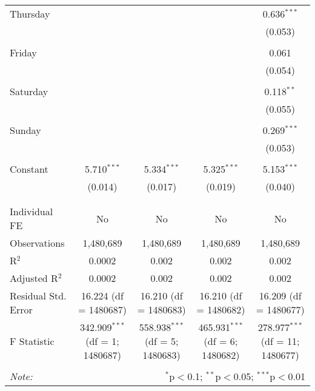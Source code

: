 \documentclass[
]{article}
\begin{document}
\begin{table}[!htbp]
{\begin{tabular}{@{\extracolsep{5pt}}lcccc}
 Thursday &  &  &  & 0.636$^{***}$ \\ 
  &  &  &  & (0.053) \\ 
  & & & & \\ 
 Friday &  &  &  & 0.061 \\ 
  &  &  &  & (0.054) \\ 
  & & & & \\ 
 Saturday &  &  &  & 0.118$^{**}$ \\ 
  &  &  &  & (0.055) \\ 
  & & & & \\ 
 Sunday &  &  &  & 0.269$^{***}$ \\ 
  &  &  &  & (0.053) \\ 
  & & & & \\ 
 Constant & 5.710$^{***}$ & 5.334$^{***}$ & 5.325$^{***}$ & 5.153$^{***}$ \\ 
  & (0.014) & (0.017) & (0.019) & (0.040) \\ 
  & & & & \\ 
\hline \\[-1.8ex] 
Individual FE & No & No & No & No \\ 
Observations & 1,480,689 & 1,480,689 & 1,480,689 & 1,480,689 \\ 
R$^{2}$ & 0.0002 & 0.002 & 0.002 & 0.002 \\ 
Adjusted R$^{2}$ & 0.0002 & 0.002 & 0.002 & 0.002 \\ 
Residual Std. Error & 16.224 (df = 1480687) & 16.210 (df = 1480683) & 16.210 (df = 1480682) & 16.209 (df = 1480677) \\ 
F Statistic & 342.909$^{***}$ (df = 1; 1480687) & 558.938$^{***}$ (df = 5; 1480683) & 465.931$^{***}$ (df = 6; 1480682) & 278.977$^{***}$ (df = 11; 1480677) \\ 
\hline 
\hline \\[-1.8ex] 
\textit{Note:}  & \multicolumn{4}{r}{$^{*}$p$<$0.1; $^{**}$p$<$0.05; $^{***}$p$<$0.01} \\ 
\end{tabular}
} 
\end{table} 
\newpage
\end{document}
